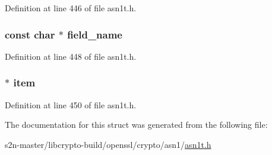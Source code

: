 Definition at line 446 of file asn1t.\+h.

\subsubsection[{\texorpdfstring{field\+\_\+name}{field_name}}]{\setlength{\rightskip}{0pt plus 5cm}const char $\ast$ field\+\_\+name}\hypertarget{struct_a_s_n1___t_e_m_p_l_a_t_e__st_a40e17d0dbb56e424e8512e1da655be9f}{}\label{struct_a_s_n1___t_e_m_p_l_a_t_e__st_a40e17d0dbb56e424e8512e1da655be9f}


Definition at line 448 of file asn1t.\+h.

\subsubsection[{\texorpdfstring{item}{item}}]{ $\ast$ item}\hypertarget{struct_a_s_n1___t_e_m_p_l_a_t_e__st_a42a630b2aafde4990b7b0717f4d2538d}{}\label{struct_a_s_n1___t_e_m_p_l_a_t_e__st_a42a630b2aafde4990b7b0717f4d2538d}


Definition at line 450 of file asn1t.\+h.



The documentation for this struct was generated from the following file\+:\begin{DoxyCompactItemize}
\item 
s2n-\/master/libcrypto-\/build/openssl/crypto/asn1/\hyperlink{crypto_2asn1_2asn1t_8h}{asn1t.\+h}\end{DoxyCompactItemize}
